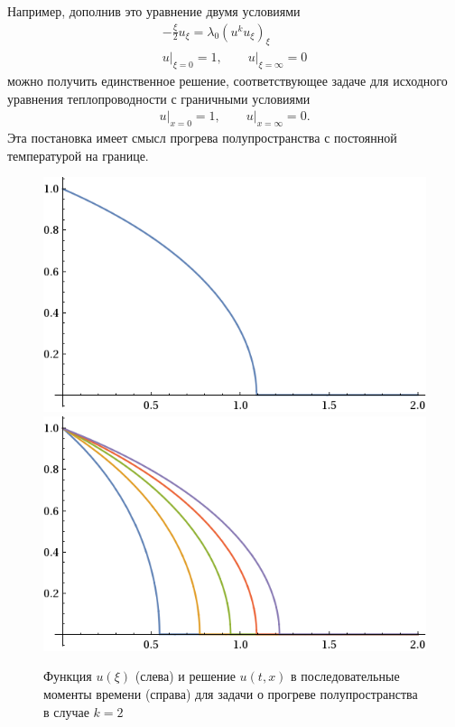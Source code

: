 \documentclass[12pt]{article}
\begin{document}
Например, дополнив это уравнение двумя условиями
\begin{gather*}
-\frac{\xi}{2}u_\xi = \lambda_0 (u^k u_\xi)_\xi\\
u\big|_{\xi = 0} = 1, \qquad u\big|_{\xi = \infty} = 0
\end{gather*}
можно получить единственное решение, соответствующее задаче для исходного уравнения теплопроводности с граничными условиями
\begin{gather*}
u\big|_{x = 0} = 1, \qquad u\big|_{x = \infty} = 0.
\end{gather*}
Эта постановка имеет смысл прогрева полупространства с постоянной температурой на границе.
\begin{figure}[ht!]
\centering
\includegraphics[width=.45\textwidth]{heating.png}
\includegraphics[width=.45\textwidth]{heattimes.png}
\caption{Функция $u(\xi)$ (слева) и решение $u(t,x)$ в последовательные моменты времени (справа) для задачи о прогреве полупространства в случае $k = 2$}
\end{figure}
\end{document}
